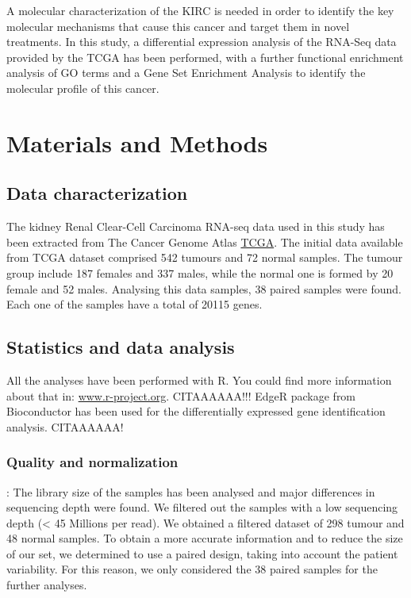 \documentclass[9pt,twocolumn,twoside]{gsajnl}
\begin{document}
A molecular characterization of the KIRC is needed in order to identify the key molecular mechanisms that cause this cancer and target them in novel treatments. In this study,  a differential expression analysis of the RNA-Seq data provided by the TCGA has been performed, with a further functional enrichment analysis of GO terms and a Gene Set Enrichment Analysis to identify the molecular profile of this cancer.

\section*{Materials and Methods}

\subsection*{Data characterization}
The kidney Renal Clear-Cell Carcinoma RNA-seq data used in this study has been extracted from The Cancer Genome Atlas \href{http://www.cancergenome.nih.gov}{TCGA}. The initial data available from TCGA dataset comprised 542 tumours and 72 normal samples. The tumour group include 187 females and 337 males, while the normal one is formed by 20 female and 52 males. Analysing this data samples, 38 paired samples were found. Each one of the samples have a total of 20115 genes. 

\subsection*{Statistics and data analysis}
All the analyses have been performed with R. You could find more information about that in: \url{www.r-project.org}. CITAAAAAA!!! EdgeR package from Bioconductor has been used for the differentially expressed gene identification analysis.  CITAAAAAA!

\subsubsection*{Quality and normalization }
: The library size of the samples has been analysed and major differences in sequencing depth were found. We filtered out the samples with a low sequencing depth (< 45 Millions per read). We obtained a filtered dataset of 298 tumour and 48 normal samples. To obtain a more accurate information and to reduce the size of our set, we determined to use a paired design, taking into account the patient variability. For this reason, we only considered the 38 paired samples for the further analyses.
\end{document}
